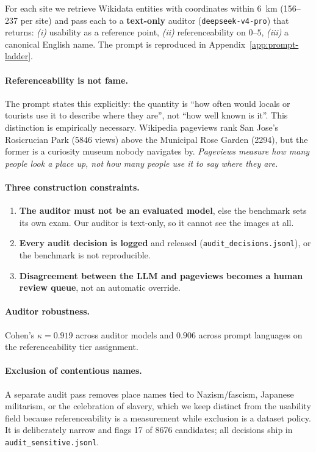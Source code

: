\documentclass[10pt,a4paper]{article}
\begin{document}
For each site we retrieve Wikidata entities with coordinates within
\SI{6}{\kilo\metre} (\num{156}--\num{237} per site) and pass each to a
\textbf{text-only} auditor (\texttt{deepseek-v4-pro}) that returns:
\emph{(i)} usability as a reference point, \emph{(ii)} referenceability on
$0$--$5$, \emph{(iii)} a canonical English name. The prompt is reproduced in
Appendix~\ref{app:prompt-ladder}.

\paragraph{Referenceability is not fame.} The prompt states this explicitly:
the quantity is ``how often would locals or tourists use it to describe where
they are'', not ``how well known is it''. This distinction is empirically
necessary. Wikipedia pageviews rank San Jose's Rosicrucian Park (\num{5846}
views) above the Municipal Rose Garden (\num{2294}), but the former is a
curiosity museum nobody navigates by. \emph{Pageviews measure how many people
look a place up, not how many people use it to say where they are.}

\paragraph{Three construction constraints.}
\begin{enumerate}
  \item \textbf{The auditor must not be an evaluated model}, else the benchmark
  sets its own exam. Our auditor is text-only, so it cannot see the images at
  all.
  \item \textbf{Every audit decision is logged} and released
  (\texttt{audit\_decisions.jsonl}), or the benchmark is not reproducible.
  \item \textbf{Disagreement between the LLM and pageviews becomes a human
  review queue}, not an automatic override.
\end{enumerate}

\paragraph{Auditor robustness.} Cohen's $\kappa = 0.919$ across auditor models
and $0.906$ across prompt languages on the referenceability tier assignment.

\paragraph{Exclusion of contentious names.} A separate audit pass removes place
names tied to Nazism/fascism, Japanese militarism, or the celebration of
slavery, which we keep distinct from the usability field because
referenceability is a measurement while exclusion is a dataset policy. It is
deliberately narrow and flags \num{17} of \num{8676} candidates; all decisions
ship in \texttt{audit\_sensitive.jsonl}.
\end{document}
